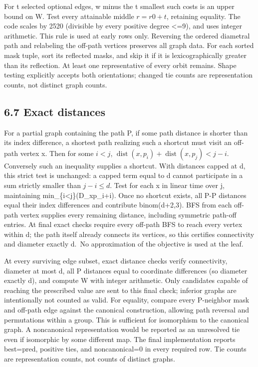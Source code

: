 \documentclass[
  11pt,
]{article}
\begin{document}
For t selected optional edges, w minus the t smallest such costs is an
upper bound on W. Test every attainable middle \(r=r0+t\), retaining
equality. The code scales by 2520 (divisible by every positive degree
\textless=9), and uses integer arithmetic. This rule is used at early
rows only. Reversing the ordered diametral path and relabeling the
off-path vertices preserves all graph data. For each sorted mask tuple,
sort its reflected masks, and skip it if it is lexicographically greater
than its reflection. At least one representative of every orbit remains.
Shape testing explicitly accepts both orientations; changed tie counts
are representation counts, not distinct graph counts.

\subsection{6.7 Exact distances}\label{exact-distances}

For a partial graph containing the path P, if some path distance is
shorter than its index difference, a shortest path realizing such a
shortcut must visit an off-path vertex x. Then for some \(i<j\),
\(\operatorname{dist}(x,p_{i})+\operatorname{dist}(x,p_{j})<j-i\).
Conversely such an inequality supplies a shortcut. With distances capped
at d, this strict test is unchanged: a capped term equal to d cannot
participate in a sum strictly smaller than \(j-i\le d\). Test for each x
in linear time over j, maintaining min\_\{i\textless j\}(D\_xp\_i+i).
Once no shortcut exists, all P-P distances equal their index differences
and contribute binom(d+2,3). BFS from each off-path vertex supplies
every remaining distance, including symmetric path-off entries. At final
exact checks require every off-path BFS to reach every vertex within d;
the path itself already connects its vertices, so this certifies
connectivity and diameter exactly d.~No approximation of the objective
is used at the leaf.

At every surviving edge subset, exact distance checks verify
connectivity, diameter at most d, all P distances equal to coordinate
differences (so diameter exactly d), and compute W with integer
arithmetic. Only candidates capable of reaching the prescribed value are
sent to this final check; inferior graphs are intentionally not counted
as valid. For equality, compare every P-neighbor mask and off-path edge
against the canonical construction, allowing path reversal and
permutations within a group. This is sufficient for isomorphism to the
canonical graph. A noncanonical representation would be reported as an
unresolved tie even if isomorphic by some different map. The final
implementation reports best=pred, positive ties, and noncanonical=0 in
every required row. Tie counts are representation counts, not counts of
distinct graphs.
\end{document}

